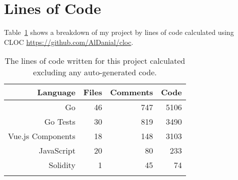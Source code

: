 
\section{Lines of Code}

Table~\ref{tab:cloc} shows a breakdown of my project by lines of code calculated using CLOC \url{https://github.com/AlDanial/cloc}. 

\begin{longtable}{ r r r r }
  \toprule
  \textbf{Language} & \textbf{Files} & \textbf{Comments} & \textbf{Code}
  \\\midrule\midrule
  Go
  & 46
  & 747
  & 5106
  \\
  Go Tests
  & 30
  & 819
  & 3490
  \\
  Vue.js Components
  & 18
  & 148
  & 3103
  \\
  JavaScript
  & 20
  & 80
  & 233
  \\
  Solidity
  & 1
  & 45
  & 74
  \\\bottomrule\bottomrule
  \caption{The lines of code written for this project calculated excluding any auto-generated code.}
  \label{tab:cloc}
\end{longtable}